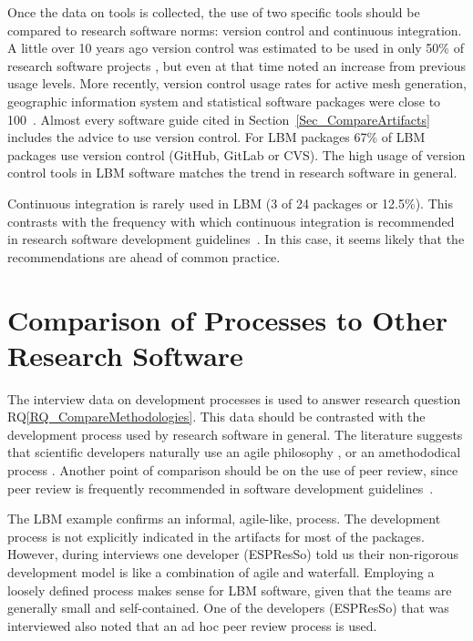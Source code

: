 \documentclass[runningheads]{llncs}
\newcommand{\rqref}[1]{RQ\ref{#1}}
\begin{document}
Once the data on tools is collected, the use of two specific tools should be
compared to research software norms: version control and continuous integration.
A little over 10 years ago version control was estimated to be used in only 50\%
of research software projects \cite{Nguyen-HoanEtAl2010}, but even at that time
\cite{Nguyen-HoanEtAl2010} noted an increase from previous usage levels. More
recently, version control usage rates for active mesh generation, geographic
information system and statistical software packages were close to
100~\cite{Smith2018}.  Almost every software guide cited in
Section~\ref{Sec_CompareArtifacts} includes the advice to use version control.
For LBM packages 67\% of LBM packages use version control (GitHub, GitLab or
CVS). The high usage of version control tools in LBM software matches the trend
in research software in general.

Continuous integration is rarely used in LBM (3 of 24 packages or 12.5\%). This
contrasts with the frequency with which continuous integration is recommended in
research software development
guidelines~\cite{BrettEtAl2021,vanGompelEtAl2016,ThielEtAl2020}. In this case,
it seems likely that the recommendations are ahead of common practice.

\section{Comparison of Processes to Other Research Software} \label{Sec_CompareMethodologies}

The interview data on development processes is used to answer research question
\rqref{RQ_CompareMethodologies}.  This data should be contrasted with the
development process used by research software in general. The literature
suggests that scientific developers naturally use an agile philosophy
\cite{CarverEtAl2007,Segal2005}, or an amethododical process \cite{Kelly2013}.
Another point of comparison should be on the use of peer review, since peer
review is frequently recommended in software development
guidelines~\cite{HerouxEtAl2008,OrvizEtAl2017,USGS2019}.

The LBM example confirms an informal, agile-like, process.
The development process is not explicitly indicated in the artifacts
for most of the packages. However, during interviews one developer (ESPResSo)
told us their non-rigorous development model is like a combination of agile and
waterfall. Employing a loosely defined process makes sense for LBM software,
given that the teams are generally small and self-contained. One of the
developers (ESPResSo) that was interviewed also noted that an ad hoc peer review
process is used.
\end{document}
